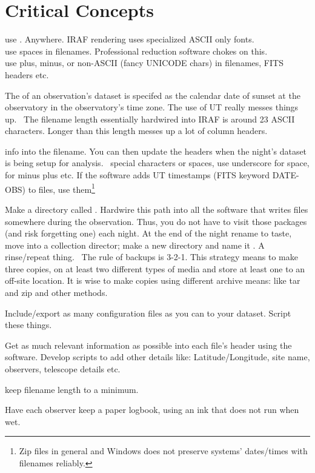 \renewcommand{\footerfilename}{CriticalConcepts.tex}

\section{Critical Concepts}


 use . Anywhere. IRAF rendering uses specialized ASCII only fonts.\\
 use spaces in filenames. Professional reduction software chokes on this. \\
 use plus, minus, or non-ASCII (fancy UNICODE chars) in filenames, FITS headers
etc.

The  of an observation's dataset is specifed as the calendar date
of sunset at the observatory in the observatory's time zone. The use
of UT really messes things up.\
 The filename length essentially hardwired into IRAF is
around 23 ASCII characters. Longer than this length messes up a lot of column headers.

 info into the filename. You
can then update the headers when the night's dataset is being setup
for analysis.\
\dhl{DO NOT USE} special characters or spaces, use underscore for
space, \dhl{m} for minus  plus etc. If the software adds UT
timestamps (FITS keyword DATE-OBS) to files, use them\footnote{Zip files in general and
Windows does not preserve systems' dates/times with filenames reliably.}

Make a directory called
. Hardwire this path into all
the software that writes files somewhere during the observation. Thus,
you do not have to visit those packages (and risk forgetting one) each
night. At the end of the night rename to taste, move into a collection
director; make a new directory and name it
\dhl{{\textasciitilde{}/Desktop/Today}}. A rinse/repeat
thing.\ \dhl{DO MAKE BACKUPS} The rule of backups is 3-2-1. This
strategy means to make three copies, on at least two different types
of media and store at least one to an off-site location. It is wise to
make copies using different archive means: like tar and zip and other
methods.

Include/export as many configuration files as you can to your dataset.
Script these things.

Get as much relevant information as possible into each file's header using
the software. Develop scripts to add other details like: Latitude/Longitude,
site name, observers, telescope details etc. 


 keep filename length to a minimum.

 Have each observer keep a paper logbook, using an ink that
does not run when wet.
